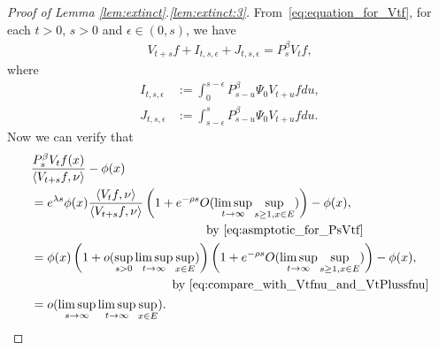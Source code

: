 \documentclass[12pt,a4paper]{amsart}
\numberwithin{equation}{section}
\theoremstyle{plain}
\theoremstyle{definition}
\begin{document}
\begin{proof}[Proof of Lemma \ref{lem:extinct}.\eqref{lem:extinct:3}]
From~\eqref{eq:equation_for_Vtf}, for each $t>0$, $s>0$ and $\epsilon \in (0,s)$, we have
\begin{align}
\label{eq:Vf_plus_I_plus_J_equals_PF}
  V_{t+s} f + I_{t,s,\epsilon} + J_{t,s,\epsilon}= P_s^\beta V_tf,
\end{align}
where
\begin{align}
I_{t,s,\epsilon}
&:= \int_0^{s-\epsilon} P_{s-u}^\beta \Psi_0 V_{t+u}f du,
\label{eq:definition_of_Its_epsilon}
\\ J_{t,s,\epsilon}
&:= \int_{s-\epsilon}^s P_{s-u}^\beta \Psi_0 V_{t+u}f du.
\label{eq:definition_of_Jtsepsilon}
\end{align}
Now we can verify that 
\begin{align}
  &\frac{ P_s^\beta V_tf(x)}{\left\langle V_{t+s} f,\nu \right\rangle } - \phi(x)
\\& \begin{multlined}= e^{\lambda s} \phi(x)\frac{  \left\langle V_tf,\nu \right\rangle   }{\left\langle V_{t+s}f,\nu \right\rangle } \left( 1+ e^{-\rho s} O(\limsup_{t\to \infty}\sup_{s\geq 1, x\in E}) \right)- \phi(x),
\\ \text{by~\eqref{eq:asmptotic_for_PsVtf}} \end{multlined}
  \\ &\begin{multlined} = \phi(x) \left( 1+o(\sup_{s>0} \limsup_{t\to \infty} \sup_{x\in E}) \right)  \left( 1+ e^{-\rho s} O(\limsup_{t\to \infty}\sup_{s\geq 1, x\in E}) \right)- \phi(x),
\\ \text{by~\eqref{eq:compare_with_Vtfnu_and_VtPlussfnu}} \end{multlined}
\\&= o(\limsup_{s\to \infty}\limsup_{t\to \infty} \sup_{x\in E}). 
\label{eq:9}
\end{align}


\end{proof}
\end{document}
